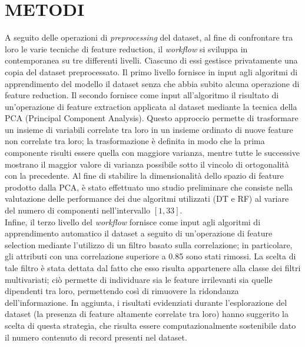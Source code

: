 \section{METODI}
A seguito delle operazioni di \textit{preprocessing} del dataset, al fine di confrontare tra loro le varie tecniche di feature reduction, il \textit{workflow} si sviluppa in contemporanea su tre differenti livelli.
Ciascuno di essi gestisce privatamente una copia del dataset preprocessato.
Il primo livello fornisce in input agli algoritmi di apprendimento del modello il dataset senza che abbia subito alcuna operazione di feature reduction.
Il secondo fornisce come input all'algoritmo il risultato di un'operazione di feature extraction applicata al dataset mediante la tecnica della PCA (Principal Component Analysis). Questo approccio permette di trasformare un insieme di variabili correlate tra loro in un insieme ordinato di nuove feature non correlate tra loro; la trasformazione è definita in modo che la prima componente risulti essere quella con maggiore varianza, mentre tutte le successive mostrano il maggior valore di varianza possibile sotto il vincolo di ortogonalità con la precedente.
Al fine di stabilire la dimensionalità dello spazio di feature prodotto dalla PCA, è stato effettuato uno studio preliminare che consiste nella valutazione delle performance dei due algoritmi utilizzati (DT e RF)  al variare del numero di componenti nell'intervallo $[1, 33]$.\\
Infine, il terzo livello del \textit{workflow} fornisce come input agli algoritmi di apprendimento automatico il dataset a seguito di un'operazione di feature selection mediante l'utilizzo di un filtro basato sulla correlazione; in particolare, gli attributi con una correlazione superiore a 0.85 sono stati rimossi. 
La scelta di tale filtro è stata dettata dal fatto che esso risulta appartenere alla classe dei filtri multivariati; ciò permette di individuare sia le feature irrilevanti sia quelle dipendenti tra loro, permettendo così di rimuovere la ridondanza dell'informazione. 
In aggiunta, i risultati evidenziati durante l'esplorazione del dataset (la presenza di feature altamente correlate tra loro) hanno suggerito la scelta di questa strategia, che risulta essere computazionalmente sostenibile dato il numero contenuto di record presenti nel dataset.

